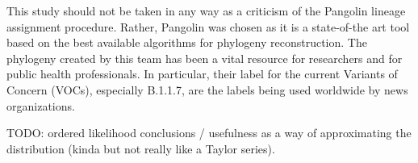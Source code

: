 \documentclass[10pt]{article}
\begin{document}
This study should not be taken in any way as a criticism of the Pangolin lineage assignment procedure.
Rather, Pangolin was chosen as it is a state-of-the art tool based on the best available algorithms for phylogeny reconstruction.
The phylogeny created by this team has been a vital resource for researchers and for public health professionals.
In particular, their label for the current Variants of Concern (VOCs), especially B.1.1.7, are the labels being used worldwide by news organizations.

TODO: ordered likelihood conclusions / usefulness as a way of approximating the distribution (kinda but not really like a Taylor series).







\end{document}
